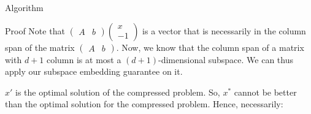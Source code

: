 \documentclass[a4paper]{article}
\begin{document}
\begin{parag}{Algorithm}
\begin{subparag}{Proof}
        Note that $\begin{pmatrix} A & b \end{pmatrix} \begin{pmatrix} x \\ -1 \end{pmatrix}$ is a vector that is necessarily in the column span of the matrix $\begin{pmatrix} A & b \end{pmatrix}$. Now, we know that the column span of a matrix with $d+1$ column is at most a $\left(d+1\right)$-dimensional subspace. We can thus apply our subspace embedding guarantee on it.

        $x'$ is the optimal solution of the compressed problem. So, $x^*$ cannot be better than the optimal solution for the compressed problem. Hence, necessarily: 
        

\end{subparag}
\end{parag}
\end{document}
